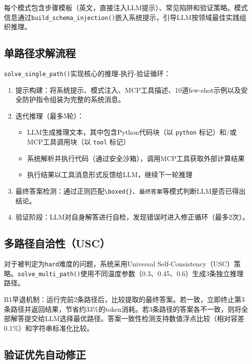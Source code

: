 \documentclass[12pt,a4paper]{ctexart}
\begin{document}
每个模式包含步骤模板（英文，直接注入LLM提示）、常见陷阱和验证策略。模式信息通过\verb|build_schema_injection()|嵌入系统提示，引导LLM按领域最佳实践组织推理。

\subsection{单路径求解流程}

\verb|solve_single_path()|实现核心的推理-执行-验证循环：

\begin{enumerate}[nosep]
  \item 提示构建：将系统提示、模式注入、MCP工具描述、10道few-shot示例以及安全防护指令组装为完整的系统消息。
  \item 迭代推理（最多5轮）：
    \begin{itemize}[nosep]
      \item LLM生成推理文本，其中包含Python代码块（以 \texttt{python} 标记）和/或MCP工具调用块（以 \texttt{tool} 标记）
      \item 系统解析并执行代码（通过安全沙箱），调用MCP工具获取外部计算结果
      \item 执行结果以工具消息形式反馈给LLM，继续下一轮推理
    \end{itemize}
  \item 最终答案检测：通过正则匹配\verb|\boxed{}|、\verb|最终答案|等模式判断LLM是否已得出结论。
  \item 验证阶段：LLM对自身解答进行自检，发现错误时进入修正循环（最多2次）。
\end{enumerate}

\subsection{多路径自洽性（USC）}

对于被判定为\texttt{hard}难度的问题，系统采用Universal Self-Consistency（USC）策略。\verb|solve_multi_path()|使用不同温度参数（0.3、0.45、0.6）生成3条独立推理路径。

B1早退机制：运行完前2条路径后，比较提取的最终答案。若一致，立即终止第3条路径并返回结果，节省约33\%的token消耗。若3条路径的答案各不一致，则将全部解答提交给LLM选择最优路径。答案一致性检测支持数值浮点比较（相对容差0.1\%）和字符串标准化比较。

\subsection{验证优先自动修正}
\end{document}
